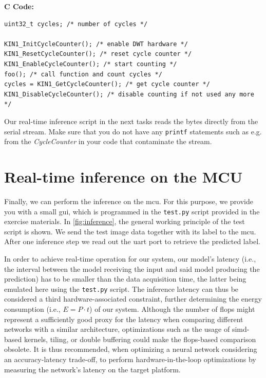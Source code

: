\documentclass[parskip=half,notes,cadrem,toolver]{iisvlsi}
\begin{document}
\textbf{C Code:}
\begin{verbatim}
uint32_t cycles; /* number of cycles */

KIN1_InitCycleCounter(); /* enable DWT hardware */
KIN1_ResetCycleCounter(); /* reset cycle counter */
KIN1_EnableCycleCounter(); /* start counting */
foo(); /* call function and count cycles */
cycles = KIN1_GetCycleCounter(); /* get cycle counter */
KIN1_DisableCycleCounter(); /* disable counting if not used any more */
\end{verbatim}

\begin{note*}
Our real-time inference script in the next tasks reads the bytes directly from the serial stream. Make sure that you do not have any \texttt{printf} statements such as e.g. from the \textit{CycleCounter} in your code that contaminate the stream.
\end{note*}


\section{Real-time inference on the MCU}

Finally, we can perform the inference on the \gls{mcu}. For this purpose, we provide you with a small \gls{gui}, which is programmed in the \texttt{test.py} script provided in the exercise materials. In \autoref{fig:inference}, the general working principle of the test script is shown. We send the test image data together with its label to the \gls{mcu}. After one inference step we read out the \gls{uart} port to retrieve the predicted label. 

In order to achieve real-time operation for our system, our model's latency (i.e., the interval between the model receiving the input and said model producing the prediction) has to be smaller than the data acquisition time, the latter being emulated here using the \texttt{test.py} script. The inference latency can thus be considered a third hardware-associated constraint, further determining the energy consumption (i.e., $E = P \cdot t$) of our system. Although the number of \glspl{flop} might represent a sufficiently good proxy for the latency when comparing different networks with a similar architecture, optimizations such as the usage of \gls{simd}-based kernels, tiling, or double buffering could make the \glspl{flop}-based comparison obsolete. It is thus recommended, when optimizing a neural network considering an accuracy-latency trade-off, to perform hardware-in-the-loop optimizations by measuring the network's latency on the target platform.
\end{document}
